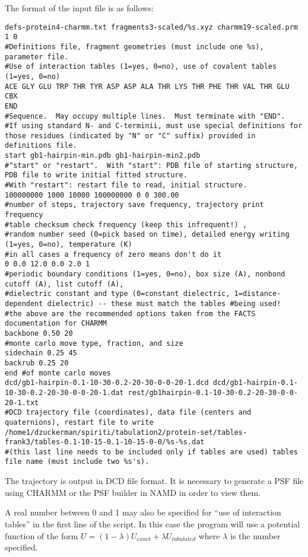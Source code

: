 \documentclass{article}      %
\begin{document}
The format of the input file is as follows:
\begin{lstlisting}
defs-protein4-charmm.txt fragments3-scaled/%s.xyz charmm19-scaled.prm 1 0
#Definitions file, fragment geometries (must include one %s), parameter file. 
#Use of interaction tables (1=yes, 0=no), use of covalent tables (1=yes, 0=no)
ACE GLY GLU TRP THR TYR ASP ASP ALA THR LYS THR PHE THR VAL THR GLU CBX
END
#Sequence.  May occupy multiple lines.  Must terminate with "END".  
#If using standard N- and C-terminii, must use special definitions for those residues (indicated by "N" or "C" suffix) provided in definitions file.
start gb1-hairpin-min.pdb gb1-hairpin-min2.pdb
#"start" or "restart".  With "start": PDB file of starting structure, PDB file to write initial fitted structure.  
#With "restart": restart file to read, initial structure.
100000000 1000 10000 100000000 0 0 300.00
#number of steps, trajectory save frequency, trajectory print frequency
#table checksum check frequency (keep this infrequent!) , 
#random number seed (0=pick based on time), detailed energy writing (1=yes, 0=no), temperature (K)
#in all cases a frequency of zero means don't do it
0 0.0 12.0 0.0 2.0 1
#periodic boundary conditions (1=yes, 0=no), box size (A), nonbond cutoff (A), list cutoff (A), 
#dielectric constant and type (0=constant dielectric, 1=distance-dependent dielectric) -- these must match the tables #being used!
#the above are the recommended options taken from the FACTS documentation for CHARMM
backbone 0.50 20
#monte carlo move type, fraction, and size
sidechain 0.25 45
backrub 0.25 20
end #of monte carlo moves
dcd/gb1-hairpin-0.1-10-30-0.2-20-30-0-0-20-1.dcd dcd/gb1-hairpin-0.1-10-30-0.2-20-30-0-0-20-1.dat rest/gb1hairpin-0.1-10-30-0.2-20-30-0-0-20-1.txt
#DCD trajectory file (coordinates), data file (centers and quaternions), restart file to write
/home1/dzuckerman/spiriti/tabulation2/protein-set/tables-frank3/tables-0.1-10-15-0.1-10-15-0-0/%s-%s.dat
#(this last line needs to be included only if tables are used) tables file name (must include two %s's).
\end{lstlisting}

The trajectory is output in DCD file format.  It is necessary to generate a PSF file using CHARMM or the PSF builder in NAMD in order to view them.



A real number between 0 and 1 may also be specified for ``use of interaction tables'' in the first line of the script.  In this case the program will use a potential function of the form $U=(1-\lambda) U_{exact} + \lambda U_{tabulated}$ where $\lambda$ is the number specified.
\end{document}
